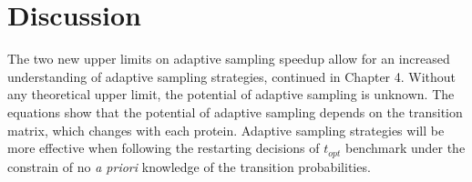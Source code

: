 \section{\label{sec:methods}Discussion}

The two new upper limits on adaptive sampling speedup allow for an increased understanding of adaptive sampling strategies, continued in Chapter 4. Without any theoretical upper limit, the potential of adaptive sampling is unknown. The equations show that the potential of adaptive sampling depends on the transition matrix, which changes with each protein. Adaptive sampling strategies will be more effective when following the restarting decisions of $t_{opt}$ benchmark under the constrain of no \emph{a priori} knowledge of the transition probabilities.



















